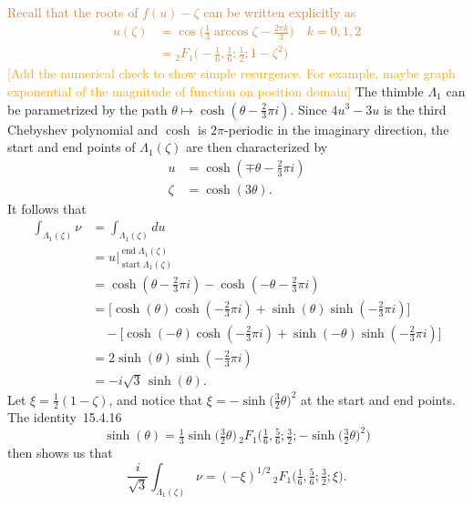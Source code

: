 \documentclass{article}
\theoremstyle{definition}
\theoremstyle{plain}
\begin{document}
\textcolor{Peru}{Recall that the roots of $f(u)-\zeta$ can be written explicitly as 
\begin{align*}
    u(\zeta)&=\cos\Big(\frac{1}{3}\arccos\zeta-\frac{2\pi k}{3}\Big) \quad k=0,1,2\\
    &={}_2F_1\Big(-\frac{1}{6},\frac{1}{6};\frac{1}{2};1-\zeta^2\Big)
\end{align*}}
\textcolor{orange}{[Add the numerical check to show simple resurgence. For example, maybe graph exponential of the magnitude of function on position domain]}
The thimble $\Lambda_1$ can be parametrized by the path $\theta \mapsto \cosh(\theta - \tfrac{2}{3}\pi i)$. Since $4u^3 - 3u$ is the third Chebyshev polynomial and $\cosh$ is $2\pi$-periodic in the imaginary direction, the start and end points of $\Lambda_1(\zeta)$ are then characterized by
\begin{align*}
u & = \cosh(\mp\theta - \tfrac{2}{3}\pi i) \\
\zeta & = \cosh(3\theta).
\end{align*}
It follows that
\begin{align*}
\int_{\Lambda_1(\zeta)} \nu & = \int_{\Lambda_1(\zeta)} du \\
& = u \Big|_{\operatorname{start} \Lambda_1(\zeta)}^{\operatorname{end} \Lambda_1(\zeta)}\\
 & = \cosh(\theta - \tfrac{2}{3}\pi i) - \cosh(-\theta - \tfrac{2}{3}\pi i) \\
& = \big[\cosh(\theta) \cosh(-\tfrac{2}{3}\pi i) + \sinh(\theta) \sinh(-\tfrac{2}{3}\pi i)\big] \\
& \quad - \big[\cosh(-\theta) \cosh(-\tfrac{2}{3}\pi i) + \sinh(-\theta) \sinh(-\tfrac{2}{3}\pi i)\big] \\
& = 2\sinh(\theta) \sinh(-\tfrac{2}{3}\pi i) \\
& = -i\sqrt{3}\,\sinh(\theta).
\end{align*}
Let $\xi = \tfrac{1}{2}(1 - \zeta)$, and notice that $\xi = -\sinh\big(\tfrac{3}{2} \theta\big)^2$ at the start and end points. The identity~15.4.16 \cite{dlmf}
\[ \sinh( \theta) = \tfrac{1}{3} \sinh\big( \tfrac{3}{2}\theta\big)\,{}_2F_1\big(\tfrac{1}{6}, \tfrac{5}{6}; \tfrac{3}{2}; -\sinh\big(\tfrac{3}{2}\theta\big)^2\big) \]
then shows us that
\[ \frac{i}{\sqrt{3}} \int_{\Lambda_1(\zeta)} \nu = (-\xi)^{1/2}\,{}_2F_1\big(\tfrac{1}{6}, \tfrac{5}{6}; \tfrac{3}{2}; \xi\big). \]
\end{document}
